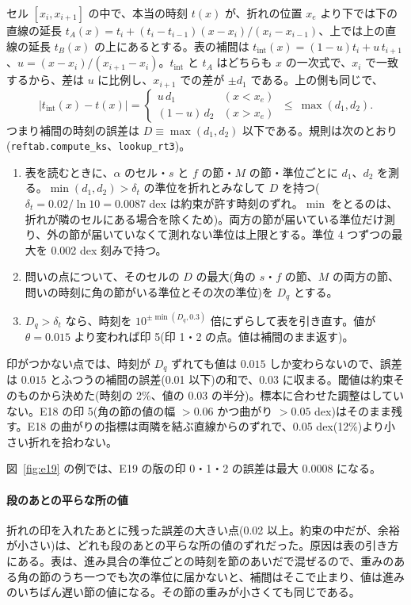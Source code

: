 セル $[x_i,x_{i+1}]$ の中で、本当の時刻 $t(x)$ が、折れの位置 $x_e$ より下では下の直線の延長 $t_A(x)=t_i+(t_i-t_{i-1})(x-x_i)/(x_i-x_{i-1})$、上では上の直線の延長 $t_B(x)$ の上にあるとする。表の補間は $t_\mathrm{int}(x)=(1-u)t_i+u\,t_{i+1}$、$u=(x-x_i)/(x_{i+1}-x_i)$。$t_\mathrm{int}$ と $t_A$ はどちらも $x$ の一次式で、$x_i$ で一致するから、差は $u$ に比例し、$x_{i+1}$ での差が $\pm d_1$ である。上の側も同じで、
\begin{equation}
|t_\mathrm{int}(x)-t(x)|=\begin{cases}u\,d_1&(x<x_e)\\(1-u)\,d_2&(x>x_e)\end{cases}\ \le\ \max(d_1,d_2).
\label{eq:e19bound}
\end{equation}
つまり補間の時刻の誤差は $D\equiv\max(d_1,d_2)$ 以下である。規則は次のとおり(\texttt{reftab.compute\_ks}、\texttt{lookup\_rt3})。
\begin{enumerate}
\item 表を読むときに、$\alpha$ のセル・$s$ と $f$ の節・$M$ の節・準位ごとに $d_1$、$d_2$ を測る。$\min(d_1,d_2)>\delta_t$ の準位を折れとみなして $D$ を持つ($\delta_t=0.02/\ln10=0.0087$ dex は約束が許す時刻のずれ。$\min$ をとるのは、折れが隣のセルにある場合を除くため)。両方の節が届いている準位だけ測り、外の節が届いていなくて測れない準位は上限とする。準位 4 つずつの最大を 0.002 dex 刻みで持つ。
\item 問いの点について、そのセルの $D$ の最大(角の $s$・$f$ の節、$M$ の両方の節、問いの時刻に角の節がいる準位とその次の準位)を $D_q$ とする。
\item $D_q>\delta_t$ なら、時刻を $10^{\pm\min(D_q,0.3)}$ 倍にずらして表を引き直す。値が $\theta=0.015$ より変われば印 5(印 1・2 の点。値は補間のまま返す)。
\end{enumerate}
印がつかない点では、時刻が $D_q$ ずれても値は $0.015$ しか変わらないので、誤差は $0.015$ とふつうの補間の誤差(0.01 以下)の和で、0.03 に収まる。閾値は約束そのものから決めた(時刻の 2\%、値の 0.03 の半分)。標本に合わせた調整はしていない。E18 の印 5(角の節の値の幅 $>0.06$ かつ曲がり $>0.05$ dex)はそのまま残す。E18 の曲がりの指標は両隣を結ぶ直線からのずれで、0.05 dex(12\%)より小さい折れを拾わない。

図~\ref{fig:e19} の例では、E19 の版の印 0・1・2 の誤差は最大 0.0008 になる。

\paragraph{段のあとの平らな所の値}
折れの印を入れたあとに残った誤差の大きい点(0.02 以上。約束の中だが、余裕が小さい)は、どれも段のあとの平らな所の値のずれだった。原因は表の引き方にある。表は、進み具合の準位ごとの時刻を節のあいだで混ぜるので、重みのある角の節のうち一つでも次の準位に届かないと、補間はそこで止まり、値は進みのいちばん遅い節の値になる。その節の重みが小さくても同じである。

